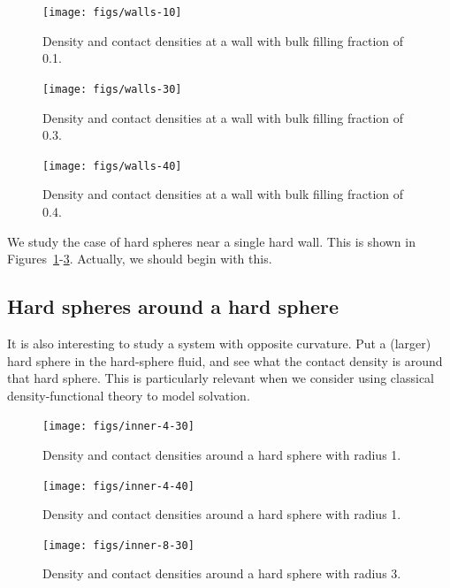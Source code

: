 \documentclass[letterpaper,twocolumn,amsmath,amssymb,prb]{revtex4-1}
\begin{document}
\begin{figure}
  \texttt{[image: figs/walls-10]}
  \caption{Density and contact densities at a wall with bulk filling
    fraction of 0.1.}
  \label{fig:walls-10}
\end{figure}

\begin{figure}
  \texttt{[image: figs/walls-30]}
  \caption{Density and contact densities at a wall with bulk filling
    fraction of 0.3.}
  \label{fig:walls-30}
\end{figure}

\begin{figure}
  \texttt{[image: figs/walls-40]}
  \caption{Density and contact densities at a wall with bulk filling
    fraction of 0.4.}
  \label{fig:walls-40}
\end{figure}

We study the case of hard spheres near a single hard wall.  This is
shown in Figures~\ref{fig:walls-10}-\ref{fig:walls-40}.  Actually, we
should begin with this.

\subsection{Hard spheres around a hard sphere}

It is also interesting to study a system with opposite curvature.  Put
a (larger) hard sphere in the hard-sphere fluid, and see what the
contact density is around that hard sphere.  This is particularly
relevant when we consider using classical density-functional theory to
model solvation.

\begin{figure}
  \texttt{[image: figs/inner-4-30]}
  \caption{Density and contact densities around a hard sphere with
    radius 1.}
  \label{fig:inner-4-30}
\end{figure}

\begin{figure}
  \texttt{[image: figs/inner-4-40]}
  \caption{Density and contact densities around a hard sphere with
    radius 1.}
  \label{fig:inner-4-40}
\end{figure}

\begin{figure}
  \texttt{[image: figs/inner-8-30]}
  \caption{Density and contact densities around a hard sphere with
    radius 3.}
  \label{fig:inner-8-30}
\end{figure}

\end{document}
